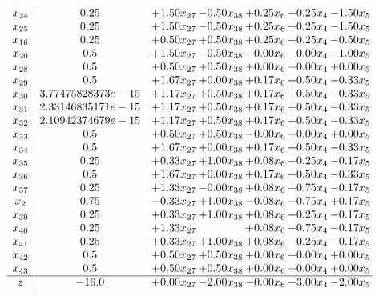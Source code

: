 \documentclass[8pt]{article}
\begin{document}
\[\begin{array}{c| c c@{\hskip 2pt} c@{\hskip 2pt} c@{\hskip 2pt} c@{\hskip 2pt} c@{\hskip 2pt} }
 x_{24}   &  0.25 & +  1.50 x_{27} & -0.50 x_{38} & +  0.25 x_{6} & +  0.25 x_{4} & -1.50 x_{5}\\
 x_{25}   &  0.25 & +  1.50 x_{27} & -0.50 x_{38} & +  0.25 x_{6} & +  0.25 x_{4} & -1.50 x_{5}\\
 x_{16}   &  0.25 & +  0.50 x_{27} & +  0.50 x_{38} & +  0.25 x_{6} & +  0.25 x_{4} & -0.50 x_{5}\\
 x_{20}   &  0.5 & +  1.50 x_{27} & -0.50 x_{38} & -0.00 x_{6} & -0.00 x_{4} & -1.00 x_{5}\\
 x_{28}   &  0.5 & +  0.50 x_{27} & +  0.50 x_{38} & +  0.00 x_{6} & -0.00 x_{4} & +  0.00 x_{5}\\
 x_{29}   &  0.5 & +  1.67 x_{27} & +  0.00 x_{38} & +  0.17 x_{6} & +  0.50 x_{4} & -0.33 x_{5}\\
 x_{30}   &  3.77475828373e-15 & +  1.17 x_{27} & +  0.50 x_{38} & +  0.17 x_{6} & +  0.50 x_{4} & -0.33 x_{5}\\
 x_{31}   &  2.33146835171e-15 & +  1.17 x_{27} & +  0.50 x_{38} & +  0.17 x_{6} & +  0.50 x_{4} & -0.33 x_{5}\\
 x_{32}   &  2.10942374679e-15 & +  1.17 x_{27} & +  0.50 x_{38} & +  0.17 x_{6} & +  0.50 x_{4} & -0.33 x_{5}\\
 x_{33}   &  0.5 & +  0.50 x_{27} & +  0.50 x_{38} & -0.00 x_{6} & +  0.00 x_{4} & +  0.00 x_{5}\\
 x_{34}   &  0.5 & +  1.67 x_{27} & +  0.00 x_{38} & +  0.17 x_{6} & +  0.50 x_{4} & -0.33 x_{5}\\
 x_{35}   &  0.25 & +  0.33 x_{27} & +  1.00 x_{38} & +  0.08 x_{6} & -0.25 x_{4} & -0.17 x_{5}\\
 x_{36}   &  0.5 & +  1.67 x_{27} & +  0.00 x_{38} & +  0.17 x_{6} & +  0.50 x_{4} & -0.33 x_{5}\\
 x_{37}   &  0.25 & +  1.33 x_{27} & -0.00 x_{38} & +  0.08 x_{6} & +  0.75 x_{4} & -0.17 x_{5}\\
 x_{2}   &  0.75 & -0.33 x_{27} & +  1.00 x_{38} & -0.08 x_{6} & -0.75 x_{4} & +  0.17 x_{5}\\
 x_{39}   &  0.25 & +  0.33 x_{27} & +  1.00 x_{38} & +  0.08 x_{6} & -0.25 x_{4} & -0.17 x_{5}\\
 x_{40}   &  0.25 & +  1.33 x_{27} &   & +  0.08 x_{6} & +  0.75 x_{4} & -0.17 x_{5}\\
 x_{41}   &  0.25 & +  0.33 x_{27} & +  1.00 x_{38} & +  0.08 x_{6} & -0.25 x_{4} & -0.17 x_{5}\\
 x_{42}   &  0.5 & +  0.50 x_{27} & +  0.50 x_{38} & +  0.00 x_{6} & +  0.00 x_{4} & +  0.00 x_{5}\\
 x_{43}   &  0.5 & +  0.50 x_{27} & +  0.50 x_{38} & +  0.00 x_{6} & +  0.00 x_{4} & +  0.00 x_{5}\\
\hline
z    &  -16.0 & +  0.00 x_{27} & -2.00 x_{38} & -0.00 x_{6} & -3.00 x_{4} & -2.00 x_{5}\\
\end{array}\]
\end{document}
